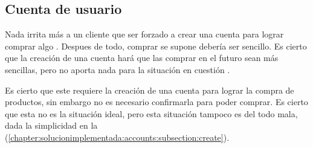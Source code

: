 \subsection{Cuenta de usuario}\label{chapter:solucionimplementada:section:account}

	Nada irrita más a un cliente que ser forzado a crear una cuenta para lograr comprar algo \online. Despues de todo, comprar \online se supone debería ser sencillo. Es cierto que la creación de una cuenta hará que las comprar en el futuro sean más sencillas, pero no aporta nada para la situación en cuestión \cite{online_official_imediaconnection_best_practices_shopping_cart}.

	Es cierto que este \frameworkPC requiere la creación de una cuenta para lograr la compra de productos, sin embargo no es necesario confirmarla para poder comprar. Es cierto que esta no es la situación ideal, pero esta situación tampoco es del todo mala, dada la simplicidad en la  (\ref{chapter:solucionimplementada:accounts:subsection:create}). 